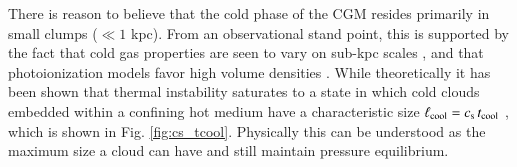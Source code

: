 \documentclass[11pt,letterpaper,english]{article}
\begin{document}
There is reason to believe that the cold phase of the CGM resides primarily in small clumps ($\ll 1$ kpc).  From an observational stand point, this is supported by the fact that cold gas properties are seen to vary on sub-kpc scales
 \cite{Rauch02, Churchill03, Lopez18}, and that photoionization models favor high volume densities \cite{Werk14,Lau16}. While theoretically it has been shown that thermal instability saturates to a state in which cold clouds embedded within a confining hot medium have a characteristic size $\ell_{\rm cool} = c_{\rm s}\, t_{\rm cool}$ \cite{McCourt18}, which is shown in Fig. \ref{fig:cs_tcool}. Physically this can be understood as the maximum size a cloud can have and still maintain pressure equilibrium. 




\end{document}
